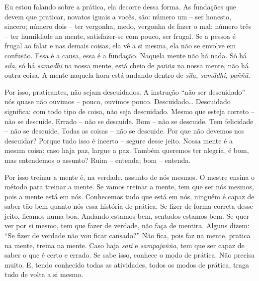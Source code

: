 Eu estou falando sobre a prática, ela decorre dessa forma. As
fundações que devem que praticar, novatos iguais a vocês, são: número
um – ser honesto, sincero; número dois – ter vergonha, medo, vergonha
de fazer o mal; número três – ter humildade na mente, satisfazer-se com
pouco, ser frugal. Se a pessoa é frugal ao falar e nas demais coisas,
ela vê a si mesma, ela não se envolve em confusão. Essa é a causa, essa
é a fundação. Naquela mente não há nada. Só há \emph{sīla}, só há
\emph{samādhi} na nossa mente, está cheio de \emph{paññā} na
nossa mente, não há outra coisa. A mente naquela hora está andando
dentro de \emph{sīla, samādhi, paññā}.

Por isso, praticantes, não sejam descuidados. A instrução “não ser
descuidado” nós quase não ouvimos – pouco, ouvimos pouco. Descuidado\ldots{}
Descuidado significa: com todo tipo de coisa, não seja descuidado.
Mesmo que esteja correto – não se descuide. Errado – não se descuide.
Bom – não se descuide. Tem felicidade – não se descuide. Todas as
coisas – não se descuide. Por que não devemos nos descuidar? Porque
tudo isso é incerto – segure desse jeito. Nossa mente é a mesma coisa:
caso haja paz, largue a paz. Também queremos ter alegria, é bom, mas
entendemos o assunto? Ruim – entenda; bom – entenda. 

Por isso treinar a mente é, na verdade, assunto de nós mesmos. O
mestre ensina o método para treinar a mente. Se vamos treinar a mente,
tem que ser nós mesmos, pois a mente está em nós. Conhecemos tudo que
está em nós, ninguém é capaz de saber tão bem quanto nós essa história
de prática. Se fizer de forma correta desse jeito, ficamos numa boa.
Andando estamos bem, sentados estamos bem. Se quer ver por si mesmo,
tem que fazer de verdade, não faça de mentira. Alguns dizem: “Se fizer
de verdade não vou ficar cansado?” Não fica, pois faz na mente, pratica
na mente, treina na mente. Caso haja \emph{sati} e
\emph{sampajañña}, tem que ser capaz de saber o que é certo e errado.
Se sabe isso, conhece o modo de prática. Não precisa muito. E, tendo
conhecido todas as atividades, todos os modos de prática, traga tudo de
volta a si mesmo.

